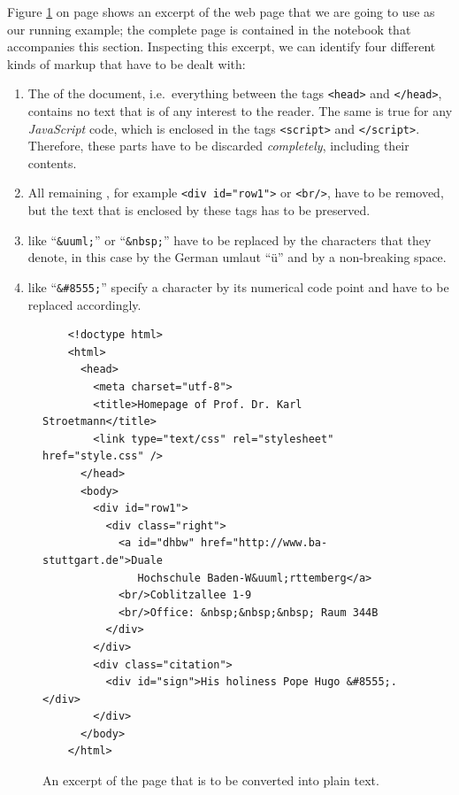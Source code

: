 Figure \ref{fig:homepage.html} on page \pageref{fig:homepage.html} shows an excerpt of the web page that we are
going to use as our running example; the complete page is contained in the notebook that accompanies this
section.  Inspecting this excerpt, we can identify four different kinds of markup that have to be dealt with:
\begin{enumerate}
\item The  of the document, i.e.\ everything between the tags \texttt{<head>} and
      \texttt{</head>}, contains no text that is of any interest to the reader.  The same is true for any
      \textsl{JavaScript} code, which is enclosed in the tags \texttt{<script>} and \texttt{</script>}.
      Therefore, these parts have to be discarded \emph{completely}, including their contents.
\item All remaining , for example \texttt{<div id="row1">} or \texttt{<br/>}, have to be removed,
      but the text that is enclosed by these tags has to be preserved.
\item {} like ``\texttt{\&uuml;}'' or ``\texttt{\&nbsp;}'' have to be
      replaced by the characters that they denote, in this case by the German umlaut ``\"u'' and by a
      non-breaking space.
\item {} like ``\texttt{\&\#8555;}'' specify a
       character by its numerical code point and have to be replaced accordingly.
\end{enumerate}

\begin{figure}[!ht]
\centering
  \begin{verbatim}
    <!doctype html>
    <html>
      <head>
        <meta charset="utf-8">
        <title>Homepage of Prof. Dr. Karl Stroetmann</title>
        <link type="text/css" rel="stylesheet" href="style.css" />
      </head>
      <body>
        <div id="row1">
          <div class="right">
            <a id="dhbw" href="http://www.ba-stuttgart.de">Duale
               Hochschule Baden-W&uuml;rttemberg</a>
            <br/>Coblitzallee 1-9
            <br/>Office: &nbsp;&nbsp;&nbsp; Raum 344B
          </div>
        </div>
        <div class="citation">
          <div id="sign">His holiness Pope Hugo &#8555;.</div>
        </div>
      </body>
    </html>
\end{verbatim}
\vspace*{-0.3cm}
\caption{An excerpt of the  page that is to be converted into plain text.}
\label{fig:homepage.html}
\end{figure}

